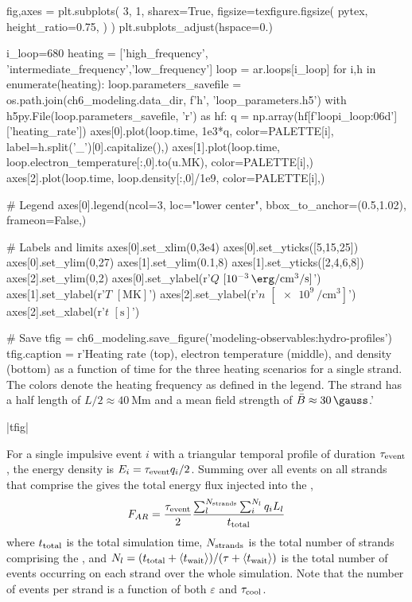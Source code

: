 \begin{pycode}
fig,axes = plt.subplots(
    3, 1, sharex=True,
    figsize=texfigure.figsize(
        pytex,
        height_ratio=0.75,
    )
)
plt.subplots_adjust(hspace=0.)

i_loop=680
heating = ['high_frequency', 'intermediate_frequency','low_frequency']
loop = ar.loops[i_loop]
for i,h in enumerate(heating):
    loop.parameters_savefile = os.path.join(ch6_modeling.data_dir, f'{h}', 'loop_parameters.h5')
    with h5py.File(loop.parameters_savefile, 'r') as hf:
        q = np.array(hf[f'loop{i_loop:06d}']['heating_rate'])
    axes[0].plot(loop.time, 1e3*q, color=PALETTE[i], label=h.split('_')[0].capitalize(),)
    axes[1].plot(loop.time, loop.electron_temperature[:,0].to(u.MK), color=PALETTE[i],)
    axes[2].plot(loop.time, loop.density[:,0]/1e9, color=PALETTE[i],)

# Legend
axes[0].legend(ncol=3, loc="lower center", bbox_to_anchor=(0.5,1.02), frameon=False,)

# Labels and limits
axes[0].set_xlim(0,3e4)
axes[0].set_yticks([5,15,25])
axes[0].set_ylim(0,27)
axes[1].set_ylim(0.1,8)
axes[1].set_yticks([2,4,6,8])
axes[2].set_ylim(0,2)
axes[0].set_ylabel(r'$Q$ $[\SI{e-3}{\erg\per\cubic\cm\per\second}]$')
axes[1].set_ylabel(r'$T$ $[\si{\mega\kelvin}]$')
axes[2].set_ylabel(r'$n$ $[\SI{e9}{\per\cubic\cm}]$')
axes[2].set_xlabel(r'$t$ $[\si{\second}]$')

# Save
tfig = ch6_modeling.save_figure('modeling-observables:hydro-profiles')
tfig.caption = r'Heating rate (top), electron temperature (middle), and density (bottom) as a function of time for the three heating scenarios for a single strand. The colors denote the heating frequency as defined in the legend. The strand has a half length of $L/2\approx\SI{40}{\mega\m}$ and a mean field strength of $\bar{B}\approx\SI{30}{\gauss}$.'
\end{pycode}
|tfig|

For a single impulsive event $i$ with a triangular temporal profile of duration $\tau_{\textup{event}}$, the energy density is $E_i=\tau_{\textup{event}}q_i/2$. Summing over all events on all strands that comprise the \AR{} gives the total energy flux injected into the \AR{},
\begin{equation}
    F_{AR} = \frac{\tau_{\textup{event}}}{2}\frac{\sum_l^{N_{\textup{strands}}}\sum_i^{N_l} q_iL_l}{t_\textup{total}}
\end{equation}
where $t_\textup{total}$ is the total simulation time, $N_\textup{strands}$ is the total number of strands comprising the \AR{}, and $N_l=(t_\textup{total} + \langle t_{\textup{wait}}\rangle)/(\tau + \langle t_{\textup{wait}}\rangle)$ is the total number of events occurring on each strand over the whole simulation. Note that the number of events per strand is a function of both $\varepsilon$ and $\tau_{\textup{cool}}$.

